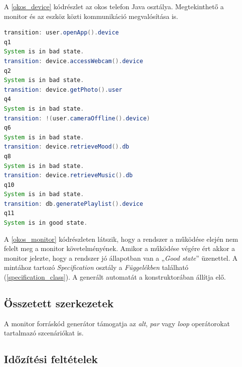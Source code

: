 A \ref{okos_device} kódrészlet az okos telefon Java osztálya.
Megtekinthető a monitor és az eszköz közti kommunikáció megvalósítása is.

\begin{lstlisting}[language=java, frame=single, float=ht!, caption={Monitor kimenete a rendszer működésének egyes fázisaiban.},captionpos=b,label=okos_monitor]
transition: user.openApp().device
q1
System is in bad state.
transition: device.accessWebcam().device
q2
System is in bad state.
transition: device.getPhoto().user
q4
System is in bad state.
transition: !(user.cameraOffline().device)
q6
System is in bad state.
transition: device.retrieveMood().db
q8
System is in bad state.
transition: device.retrieveMusic().db
q10
System is in bad state.
transition: db.generatePlaylist().device
q11
System is in good state.
\end{lstlisting}

A \ref{okos_monitor} kódrészleten látszik, hogy a rendszer a működése elején nem felelt meg a monitor követelményének.
Amikor a működése végére ért akkor a monitor jelezte, hogy a rendszer jó állapotban van a „\textit{Good state}” üzenettel.
A mintához tartozó \textit{Specification} osztály a \textit{Függelékben} található (\ref{specification_class}).
A generált automatát a konstruktorában állítja elő.

\clearpage\subsection{Összetett szerkezetek}

A monitor forráskód generátor támogatja az \textit{alt}, \textit{par} vagy \textit{loop} operátorokat tartalmazó szcenáriókat is.

\subsection{Időzítési feltételek}

